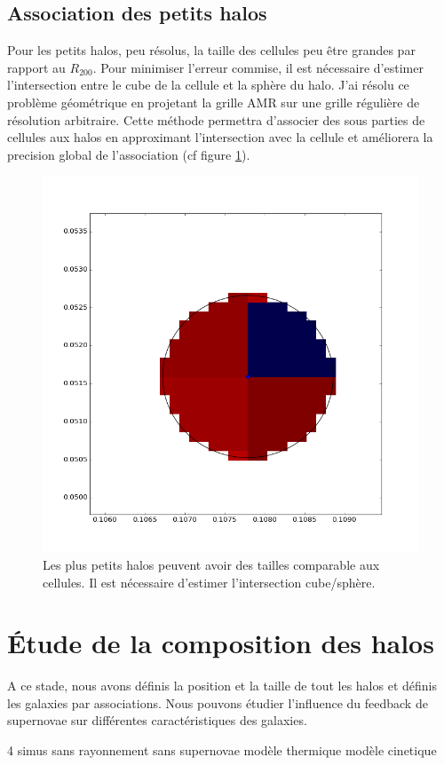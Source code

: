 \subsection{Association des petits halos}
Pour les petits halos, peu résolus, la taille des cellules peu être grandes par rapport au $R_{200}$.
Pour minimiser l'erreur commise, il est nécessaire d’estimer l'intersection entre le cube de la cellule et la sphère du halo.
J'ai résolu ce problème géométrique en projetant la grille \ac{AMR} sur une grille régulière de résolution arbitraire.
Cette méthode permettra d'associer des sous parties de cellules aux halos en approximant l'intersection avec la cellule et améliorera la precision global de l'association (cf figure \ref{fig:intersec}).

\begin{figure}
	\centering
	\includegraphics[width=.45\linewidth]{img/03/intersec.png}
    \caption[Projection des petits halo]{Les plus petits halos peuvent avoir des tailles comparable aux cellules.
    Il est nécessaire d’estimer l'intersection cube/sphère.
 	\label{fig:intersec}}
\end{figure}

\clearpage
\section{Étude de la composition des halos}

A ce stade, nous avons définis la position et la taille de tout les halos et définis les galaxies par associations.
Nous pouvons étudier l'influence du feedback de supernovae sur différentes caractéristiques des galaxies.

4 simus 
sans rayonnement
sans supernovae
modèle thermique 
modèle cinetique

